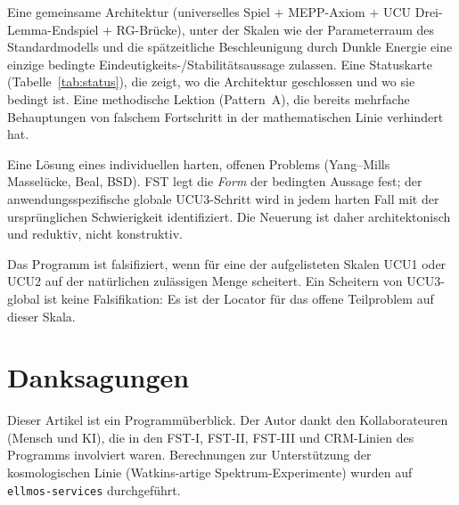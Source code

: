 \documentclass[11pt,a4paper]{article}
\theoremstyle{remark}
\begin{document}
\begin{description}[leftmargin=2em,style=nextline]
\item[Was FST liefert.]
Eine gemeinsame Architektur (universelles Spiel $+$ MEPP-Axiom $+$ UCU Drei-Lemma-Endspiel $+$ RG-Brücke), unter der Skalen wie der Parameterraum des Standardmodells und die spätzeitliche Beschleunigung durch Dunkle Energie eine einzige bedingte Eindeutigkeits-/Stabilitätsaussage zulassen. Eine Statuskarte (Tabelle~\ref{tab:status}), die zeigt, wo die Architektur geschlossen und wo sie bedingt ist. Eine methodische Lektion (Pattern~A), die bereits mehrfache Behauptungen von falschem Fortschritt in der mathematischen Linie verhindert hat.

\item[Was FST \emph{nicht} liefert.]
Eine Lösung eines individuellen harten, offenen Problems (Yang--Mills Masselücke, Beal, BSD). FST legt die \emph{Form} der bedingten Aussage fest; der anwendungsspezifische globale UCU3-Schritt wird in jedem harten Fall mit der ursprünglichen Schwierigkeit identifiziert. Die Neuerung ist daher architektonisch und reduktiv, nicht konstruktiv.

\item[Falsifikationskriterium.]
Das Programm ist falsifiziert, wenn für eine der aufgelisteten Skalen UCU1 oder UCU2 auf der natürlichen zulässigen Menge scheitert. Ein Scheitern von UCU3-global ist keine Falsifikation: Es ist der Locator für das offene Teilproblem auf dieser Skala.
\end{description}

\section*{Danksagungen}
Dieser Artikel ist ein Programmüberblick. Der Autor dankt den Kollaborateuren (Mensch und KI), die in den FST-I, FST-II, FST-III und CRM-Linien des Programms involviert waren. Berechnungen zur Unterstützung der kosmologischen Linie (Watkins-artige Spektrum-Experimente) wurden auf \texttt{ellmos-services} durchgeführt.

\end{document}
